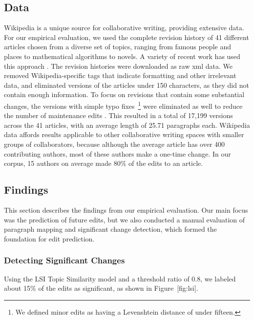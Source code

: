 \subsection{Data}\label{data}

Wikipedia is a unique source for collaborative writing, providing
extensive data. For our empirical evaluation, we used the complete
revision history of 41 different articles chosen from a diverse set of
topics, ranging from famous people and places to mathematical algorithms
to novels. A variety of recent work has used this approach
\cite{wohner2009assessing, fong2010did}. The revision histories were
downloaded as raw xml data. We removed Wikipedia-specific tags that
indicate formatting and other irrelevant data, and eliminated versions
of the articles under 150 characters, as they did not contain enough
information. To focus on revisions that contain some substantial
changes, the versions with simple typo fixes~\footnote{We defined minor
  edits as having a Levenshtein distance of under fifteen.} were
eliminated as well to reduce the number of maintenance edits
\cite{kittur2007he}. This resulted in a total of 17,199 versions across
the 41 articles, with an average length of 25.71 paragraphs each.
Wikipedia data affords results applicable to other collaborative writing
spaces with smaller groups of collaborators, because although the
average article has over 400 contributing authors, most of these authors
make a one-time change. In our corpus, 15 authors on average made 80\%
of the edits to an article.

\subsection{Findings}\label{findings}

This section describes the findings from our empirical evaluation. Our
main focus was the prediction of future edits, but we also conducted a
manual evaluation of paragraph mapping and significant change detection,
which formed the foundation for edit prediction.

\subsubsection{Detecting Significant
Changes}\label{detecting-significant-changes}

Using the LSI Topic Similarity model and a threshold ratio of 0.8, we
labeled about 15\% of the edits as significant, as shown in
Figure~{[}fig:lsi{]}.

